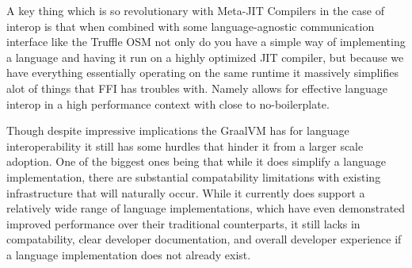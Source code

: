A key thing which is so revolutionary with Meta-JIT Compilers in the case of interop is that when combined with some language-agnostic communication interface like the Truffle OSM not only do you have a simple way of implementing a language and having it run on a highly optimized JIT compiler, but because we have everything essentially operating on the same runtime it massively simplifies alot of things that FFI has troubles with. Namely allows for effective language interop in a high performance context with close to no-boilerplate.

Though despite impressive implications the GraalVM has for language interoperability it still has some hurdles that hinder it from a larger scale adoption. One of the biggest ones being that while it does simplify a language implementation, there are substantial compatability limitations with existing infrastructure that will naturally occur. While it currently does support a relatively wide range of language implementations, which have even demonstrated improved performance over their traditional counterparts, it still lacks in compatability, clear developer documentation, and overall developer experience if a language implementation does not already exist.